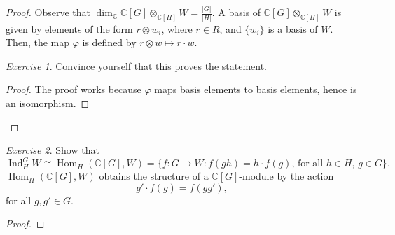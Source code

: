 \documentclass[a4paper]{report}
\theoremstyle{definition}
\theoremstyle{remark}
\theoremstyle{proposition}
\theoremstyle{conjecture}
\theoremstyle{lemma}
\theoremstyle{corollary}
\theoremstyle{exercise}
\newtheorem{exercise}{Exercise}
\theoremstyle{example}
\newcommand{\C}{\mathbb{C}}
\newcommand{\on}{\operatorname}
\begin{document}
\begin{proof}
    Observe that 
    $\dim_\C \C[G]\otimes_{\C[H]} W = \frac{\vert G\vert}{\vert H\vert}$.
    A basis of $\C[G]\otimes_{\C[H]}W$ is given by elements of the form 
    $r\otimes w_i$, where $r\in R$, and $\lbrace w_i\rbrace$ is a basis of 
    $W$. Then, the map $\varphi$ is defined by $r\otimes w \mapsto r\cdot w$.
    \begin{exercise}
        Convince yourself that this proves the statement.
    \end{exercise}
    \begin{proof}
        The proof works because $\varphi$ maps basis elements to
        basis elements, hence is an isomorphism.
    \end{proof}
\end{proof}

\begin{exercise}
    Show that $$\on{Ind}_H^G W \cong \on{Hom}_H(\C[G], W) = \lbrace f: G \to W :\text{$f(gh) = h\cdot f(g)$, for all $h\in H$, $g\in G$}\rbrace.$$
    $\on{Hom}_H(\C[G],W)$ obtains the structure of a $\C[G]$-module 
    by the action 
    $$g' \cdot f(g) = f(gg'),$$
    for all $g,g'\in G$.
\end{exercise}

\begin{proof}

\end{proof}
\end{document}
